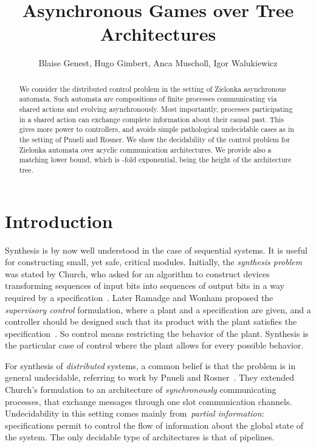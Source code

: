 \documentclass{llncs}
\begin{document}
\title{Asynchronous Games over Tree Architectures}


\author{Blaise Genest, Hugo Gimbert, Anca Muscholl,
  Igor Walukiewicz}


\maketitle

\begin{abstract}
 We consider the distributed control problem in the setting of
  Zielonka asynchronous automata. 
  Such automata are compositions of finite processes
  communicating via shared actions and evolving asynchronously. Most
  importantly, processes participating in a shared action can exchange
  complete information about their causal past. This gives more power
  to controllers, and avoids simple pathological undecidable cases as
  in the setting of Pnueli
  and Rosner.
  We show the decidability of the control problem for
  Zielonka automata over acyclic communication architectures.  We
  provide also a matching lower bound, which is -fold exponential,
   being the height of the architecture tree.
\end{abstract}


\section{Introduction}\label{sec:intro}
Synthesis is by now well understood in the case of sequential systems.
It is useful for constructing small, yet safe, critical modules.
Initially, the {\em synthesis problem} was stated by Church, who asked
for an algorithm to construct devices transforming sequences of input
bits into sequences of output bits in a way required by a
specification~\cite{church62}. Later Ramadge and Wonham proposed the
{\em supervisory control} formulation, where a plant and a
specification are given, and a controller should be designed such that
its product with the plant satisfies the specification~\cite{RW89}. So
control means restricting the behavior of the plant. Synthesis is the
particular case of control where the plant allows for every possible
behavior.

For synthesis of {\em distributed} systems, a common belief is that the
problem is in general undecidable, referring to work by Pnueli and
Rosner~\cite{PR90}. They extended Church's 
formulation to an architecture of {\em synchronously} communicating
processes, that exchange messages through one slot communication
channels. Undecidability in this setting comes mainly from~\emph{partial
information}: specifications permit to control the flow of information about the global state of the system. The only
decidable type of architectures is that of pipelines.
\end{document}
